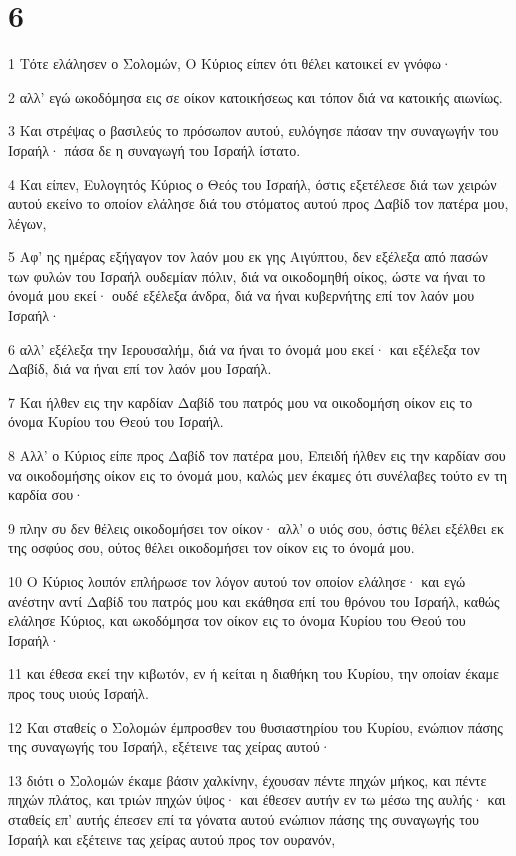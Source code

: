 \chapter{6}

\par 1 Τότε ελάλησεν ο Σολομών, Ο Κύριος είπεν ότι θέλει κατοικεί εν γνόφω·
\par 2 αλλ' εγώ ωκοδόμησα εις σε οίκον κατοικήσεως και τόπον διά να κατοικής αιωνίως.
\par 3 Και στρέψας ο βασιλεύς το πρόσωπον αυτού, ευλόγησε πάσαν την συναγωγήν του Ισραήλ· πάσα δε η συναγωγή του Ισραήλ ίστατο.
\par 4 Και είπεν, Ευλογητός Κύριος ο Θεός του Ισραήλ, όστις εξετέλεσε διά των χειρών αυτού εκείνο το οποίον ελάλησε διά του στόματος αυτού προς Δαβίδ τον πατέρα μου, λέγων,
\par 5 Αφ' ης ημέρας εξήγαγον τον λαόν μου εκ γης Αιγύπτου, δεν εξέλεξα από πασών των φυλών του Ισραήλ ουδεμίαν πόλιν, διά να οικοδομηθή οίκος, ώστε να ήναι το όνομά μου εκεί· ουδέ εξέλεξα άνδρα, διά να ήναι κυβερνήτης επί τον λαόν μου Ισραήλ·
\par 6 αλλ' εξέλεξα την Ιερουσαλήμ, διά να ήναι το όνομά μου εκεί· και εξέλεξα τον Δαβίδ, διά να ήναι επί τον λαόν μου Ισραήλ.
\par 7 Και ήλθεν εις την καρδίαν Δαβίδ του πατρός μου να οικοδομήση οίκον εις το όνομα Κυρίου του Θεού του Ισραήλ.
\par 8 Αλλ' ο Κύριος είπε προς Δαβίδ τον πατέρα μου, Επειδή ήλθεν εις την καρδίαν σου να οικοδομήσης οίκον εις το όνομά μου, καλώς μεν έκαμες ότι συνέλαβες τούτο εν τη καρδία σου·
\par 9 πλην συ δεν θέλεις οικοδομήσει τον οίκον· αλλ' ο υιός σου, όστις θέλει εξέλθει εκ της οσφύος σου, ούτος θέλει οικοδομήσει τον οίκον εις το όνομά μου.
\par 10 Ο Κύριος λοιπόν επλήρωσε τον λόγον αυτού τον οποίον ελάλησε· και εγώ ανέστην αντί Δαβίδ του πατρός μου και εκάθησα επί του θρόνου του Ισραήλ, καθώς ελάλησε Κύριος, και ωκοδόμησα τον οίκον εις το όνομα Κυρίου του Θεού του Ισραήλ·
\par 11 και έθεσα εκεί την κιβωτόν, εν ή κείται η διαθήκη του Κυρίου, την οποίαν έκαμε προς τους υιούς Ισραήλ.
\par 12 Και σταθείς ο Σολομών έμπροσθεν του θυσιαστηρίου του Κυρίου, ενώπιον πάσης της συναγωγής του Ισραήλ, εξέτεινε τας χείρας αυτού·
\par 13 διότι ο Σολομών έκαμε βάσιν χαλκίνην, έχουσαν πέντε πηχών μήκος, και πέντε πηχών πλάτος, και τριών πηχών ύψος· και έθεσεν αυτήν εν τω μέσω της αυλής· και σταθείς επ' αυτής έπεσεν επί τα γόνατα αυτού ενώπιον πάσης της συναγωγής του Ισραήλ και εξέτεινε τας χείρας αυτού προς τον ουρανόν,

